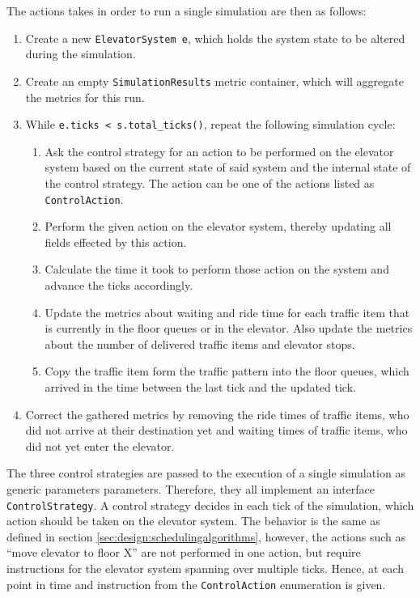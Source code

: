 The actions takes in order to run a single simulation are then as follows:
\begin{enumerate}
    \item Create a new \texttt{ElevatorSystem e}, which holds the system state to be altered during the simulation.
    \item Create an empty \texttt{SimulationResults} metric container, which will aggregate the metrics for this run.
    \item While \texttt{e.ticks < s.total\_ticks()}, repeat the following simulation cycle:
    \begin{enumerate}
        \item Ask the control strategy for an action to be performed on the elevator system based on the current state of said system and the internal state of the control strategy.
        The action can be one of the actions listed as \texttt{ControlAction}.
        \item Perform the given action on the elevator system, thereby updating all fields effected by this action.
        \item Calculate the time it took to perform those action on the system and advance the ticks accordingly.
        \item Update the  metrics about waiting and ride time for each traffic item that is currently in the floor queues or in the elevator. Also update the metrics about the number of delivered traffic items and elevator stops.
        \item Copy the traffic item form the traffic pattern into the floor queues, which arrived in the time between the last tick and the updated tick.
    \end{enumerate}
    \item Correct the gathered metrics by removing the ride times of traffic items, who did not arrive at their destination yet and waiting times of traffic items, who did not yet enter the elevator.
\end{enumerate}

The three control strategies are passed to the execution of a single simulation as generic parameters parameters.
Therefore, they all implement an interface \texttt{ControlStrategy}.
A control strategy decides in each tick of the simulation, which action should be taken on the elevator system.
The behavior is the same as defined in section \ref{sec:design:schedulingalgorithms}, however, the actions such as \enquote{move elevator to floor X} are not performed in one action, but require instructions for the elevator system spanning over multiple ticks.
Hence, at each point in time and instruction from the \texttt{ControlAction} enumeration is given.

